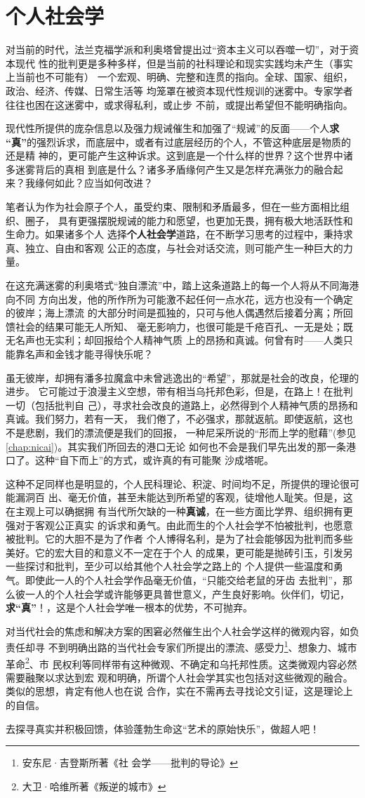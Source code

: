 \chapter{个人社会学}
\label{chap:gerenshehuixue}

对当前的时代，法兰克福学派和利奥塔曾提出过“资本主义可以吞噬一切”，对于资本现代
性的批判更是多种多样，但是当前的社科理论和现实实践均未产生（事实上当前也不可能有）
一个宏观、明确、完整和连贯的指向。全球、国家、组织，政治、经济、传媒、日常生活等
均笼罩在被资本现代性规训的迷雾中。专家学者往往也困在这迷雾中，或求得私利，或止步
不前，或提出希望但不能明确指向。

现代性所提供的庞杂信息以及强力规诫催生和加强了``规诫''的反面——个人\textbf{求
“真”}的强烈诉求，而底层中，或者有过底层经历的个人，不管这种底层是物质的还是精
神的，更可能产生这种诉求。这到底是一个什么样的世界？这个世界中诸多迷雾背后的真相
到底是什么？诸多矛盾缘何产生又是怎样充满张力的融合起来？我缘何如此？应当如何改进？

笔者认为作为社会原子个人，虽受约束、限制和矛盾最多，但在一些方面相比组织、圈子，
具有更强摆脱规诫的能力和愿望，也更加无畏，拥有极大地活跃性和生命力。如果诸多个人
选择\textbf{个人社会学}道路，在不断学习思考的过程中，秉持求真、独立、自由和客观
公正的态度，与社会对话交流，则可能产生一种巨大的力量。

在这充满迷雾的利奥塔式“独自漂流”中，踏上这条道路上的每一个人将从不同海港向不同
方向出发，他的所作所为可能激不起任何一点水花，远方也没有一个确定的彼岸；海上漂流
的大部分时间是孤独的，只可与他人偶遇然后接着分离；所回馈社会的结果可能无人所知、
毫无影响力，也很可能是千疮百孔、一无是处；既无名声也无实利；却回报给个人精神气质
上的昂扬和真诚。何曾有时——人类只能靠名声和金钱才能寻得快乐呢？

虽无彼岸，却拥有潘多拉魔盒中未曾逃逸出的“希望”，那就是社会的改良，伦理的进步。
它可能过于浪漫主义空想，带有相当乌托邦色彩，但是，在路上！在批判一切（包括批判自
己），寻求社会改良的道路上，必然得到个人精神气质的昂扬和真诚。我们努力，若有一天，
我们倦了，不必强求，那就返航。即使返航，这也不是悲剧，我们的漂流便是我们的回报，
一种尼采所说的“形而上学的慰藉”(参见\cref{chap:nicai})。其实我们所回去的港口无论
如何也不会是我们早先出发的那一条港口了。这种“自下而上”的方式，或许真的有可能聚
沙成塔呢。

这种不足同样也是明显的，个人民科理论、积淀、时间均不足，所提供的理论很可能漏洞百
出、毫无价值，甚至未能达到所希望的客观，徒增他人耻笑。但是，这在主观上可以确据拥
有当代所欠缺的一种\textbf{真诚}，在一些方面比学界、组织拥有更强对于客观公正真实
的诉求和勇气。由此而生的个人社会学不怕被批判，也愿意被批判。它的大胆不是为了作者
个人博得名利，是为了社会能够因为批判而多些美好。它的宏大目的和意义不一定在于个人
的成果，更可能是抛砖引玉，引发另一些探讨和批判，至少可以给其他个人社会学之路上的
个人提供一些温度和勇气。即使此一人的个人社会学作品毫无价值，“只能交给老鼠的牙齿
去批判”，那么彼一人的个人社会学或许能够更具普世意义，产生良好影响。伙伴们，切记，
\textbf{求“真”}！，这是个人社会学唯一根本的优势，不可抛弃。

对当代社会的焦虑和解决方案的困窘必然催生出个人社会学这样的微观内容，如负责任却寻
不到明确出路的当代社会专家们所提出的漂流、感受力\footnote{安东尼·吉登斯所著《社
会学——批判的导论》}、想象力、城市革命\footnote{大卫·哈维所著《叛逆的城市》}、市
民权利等同样带有这种微观、不确定和乌托邦性质。这类微观内容必然需要融聚以求达到宏
观和明确，所谓个人社会学其实也包括对这些微观的融合。类似的思想，肯定有他人也在说
合作，实在不需再去寻找论文引证，这是理论上的自信。

去探寻真实并积极回馈，体验蓬勃生命这“艺术的原始快乐”，做超人吧！